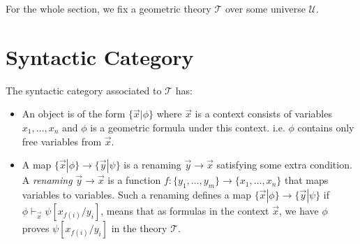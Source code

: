 \newcommand{\thT}{\ensuremath{\mathcal{T}}}
\newcommand{\fmlInCtx}[2]{\{ #1 | #2 \}}
\newcommand{\subs}[2]{{#1}[{#1}]}
\newcommand{\Univ}{\ensuremath{\mathscr{U}}}
\newcommand{\quot}{\text{quot}}
\newcommand{\vxz}{\vec{x}+\vec{z}}
\newcommand{\vw}{\vec{w}}
\newcommand{\vx}{\vec{x}}
\newcommand{\vy}{\vec{y}}
\newcommand{\vz}{\vec{z}}
\newcommand{\iotas}{\ensuremath{[\iota_1,\iota_2]}}
\newcommand{\xphi}{\fmlInCtx{\vec{x}}{\phi}}
\newcommand{\ypsi}{\fmlInCtx{\vec{y}}{\psi}}
\newcommand{\zzeta}{\fmlInCtx{\vec{z}}{\zeta}}
\newcommand{\ophi}{\overline{\phi}}
\newcommand{\opsi}{\overline{\psi}}
\newcommand{\ozeta}{\overline{\zeta}}
\newcommand{\inl}{\mathsf{inl}}
\newcommand{\inr}{\mathsf{inr}}

\newcommand{\tphi}{\tilde{\phi}}
\newcommand{\tpsi}{\tilde{\psi}}
\newcommand{\tzeta}{\tilde{\zeta}}
\newcommand{\ox}{\overline{x}}
\newcommand{\oz}{\overline{z}}

For the whole section, we fix a geometric theory \thT{} over some universe \Univ{}.

\section{Syntactic Category}
\begin{definition}
  \leanok
  The syntactic category associated to $\mathcal{T}$ has:
  \begin{itemize}
    \item An object is of the form $\xphi$ where $\vx$ is a context consists of variables $x_1, \ldots, x_{n}$ and $\phi $ is a geometric
    formula under this context. i.e. $\phi$ contains only free variables from $\vx$.
    \item A map $\xphi\to \ypsi$ is a renaming $\vy\to \vx$ satisfying some extra condition. 
    A \emph{renaming} $\vy\to \vx$ is a function $f:\{y_1,\ldots,y_m\}\to \{x_1,\ldots,x_n\}$ that maps variables to variables.
    Such a renaming defines a map $\xphi\to \ypsi$ if $\phi\vdash_{\vx}\psi[x_{f(i)}/y_i]$, means that as formulas in the context $\vx$, we have $\phi$
    proves $\psi[x_{f(i)}/y_i]$ in the theory  \thT{}.
  \end{itemize}
\end{definition}



